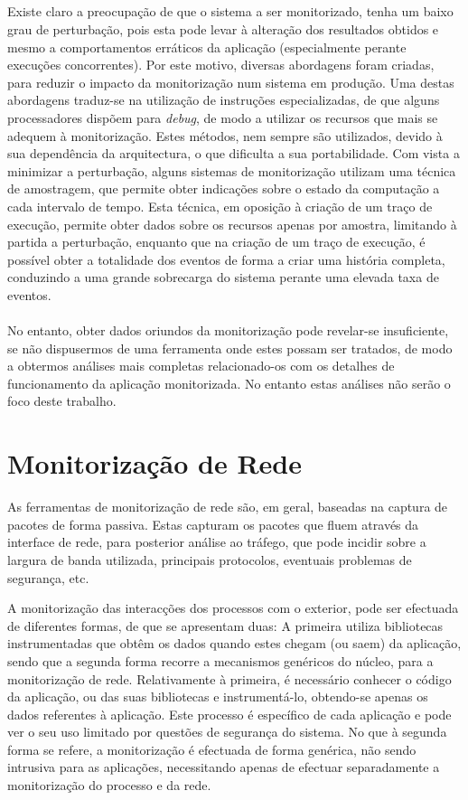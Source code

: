 \subparagraph*{
}
Existe claro a preocupação de que o sistema a ser monitorizado, tenha um baixo grau de perturbação, pois esta pode levar à alteração dos resultados obtidos e mesmo a comportamentos erráticos da aplicação (especialmente perante execuções concorrentes).
Por este motivo, diversas abordagens foram criadas, para reduzir o impacto da monitorização num sistema em produção.
Uma destas abordagens traduz-se na utilização de instruções especializadas, de que alguns processadores dispõem para \textit{debug}, de modo a utilizar os recursos que mais se adequem à monitorização.
Estes métodos, nem sempre são utilizados, devido à sua dependência da arquitectura, o que dificulta a sua portabilidade.
Com vista a minimizar a perturbação, alguns sistemas de monitorização utilizam uma técnica de amostragem, que permite obter indicações sobre o estado da computação a cada intervalo de tempo.
Esta técnica, em oposição à criação de um traço de execução, permite obter dados sobre os recursos apenas por amostra, limitando à partida a perturbação, enquanto que na criação de um traço de execução, é possível obter a totalidade dos eventos de forma a criar uma história completa, conduzindo a uma grande sobrecarga do sistema perante uma elevada taxa de eventos.

\paragraph*{
}
No entanto, obter dados oriundos da monitorização pode revelar-se insuficiente, se não dispusermos de uma ferramenta onde estes possam ser tratados, de modo a obtermos análises mais completas relacionado-os com os detalhes de funcionamento da aplicação monitorizada.
No entanto estas análises não serão o foco deste trabalho.

\section{Monitorização de Rede}\label{sub:network_monitoring}

As ferramentas de monitorização de rede são, em geral, baseadas na captura de pacotes de forma passiva.
Estas capturam os pacotes que fluem através da interface de rede, para posterior análise ao tráfego, que pode incidir sobre a largura de banda utilizada, principais protocolos, eventuais problemas de segurança, etc.

A monitorização das interacções dos processos com o exterior, pode ser efectuada de diferentes formas, de que se apresentam duas:
A primeira utiliza bibliotecas instrumentadas que obtêm os dados quando estes chegam (ou saem) da aplicação, sendo que a segunda forma recorre a mecanismos genéricos do núcleo, para a monitorização de rede.
Relativamente à primeira, é necessário conhecer o código da aplicação, ou das suas bibliotecas e instrumentá-lo, obtendo-se apenas os dados referentes à aplicação.
Este processo é específico de cada aplicação e pode ver o seu uso limitado por questões de segurança do sistema.
No que à segunda forma se refere, a monitorização é efectuada de forma genérica, não sendo intrusiva para as aplicações, necessitando apenas de efectuar separadamente a monitorização do processo e da rede.

